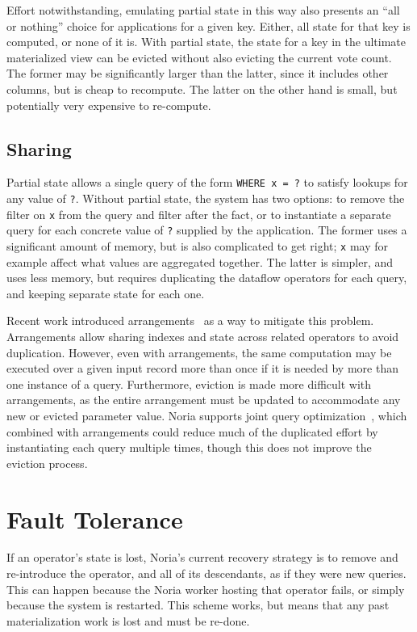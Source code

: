 Effort notwithstanding, emulating partial state in this way also presents an
``all or nothing'' choice for applications for a given key. Either, all state
for that key is computed, or none of it is. With partial state, the state for a
key in the ultimate materialized view can be evicted without also evicting the
current vote count. The former may be significantly larger than the latter,
since it includes other columns, but is cheap to recompute. The latter on the
other hand is small, but potentially very expensive to re-compute.

\subsection{Sharing}

Partial state allows a single query of the form \texttt{WHERE x = ?} to satisfy
lookups for any value of \texttt{?}. Without partial state, the system has two
options: to remove the filter on \texttt{x} from the query and filter after the
fact, or to instantiate a separate query for each concrete value of \texttt{?}
supplied by the application. The former uses a significant amount of memory, but
is also complicated to get right; \texttt{x} may for example affect what values
are aggregated together. The latter is simpler, and uses less memory, but
requires duplicating the dataflow operators for each query, and keeping separate
state for each one.

Recent work introduced arrangements~\cite{arrangements} as a way to mitigate
this problem. Arrangements allow sharing indexes and state across related
operators to avoid duplication. However, even with arrangements, the same
computation may be executed over a given input record more than once if it is
needed by more than one instance of a query. Furthermore, eviction is made more
difficult with arrangements, as the entire arrangement must be updated to
accommodate any new or evicted parameter value. Noria supports joint query
optimization~\cite{noria}, which combined with arrangements could reduce much of
the duplicated effort by instantiating each query multiple times, though this
does not improve the eviction process.

\section{Fault Tolerance}

If an operator's state is lost, Noria's current recovery strategy is to remove
and re-introduce the operator, and all of its descendants, as if they were new
queries. This can happen because the Noria worker hosting that operator fails,
or simply because the system is restarted. This scheme works, but means that any
past materialization work is lost and must be re-done.

